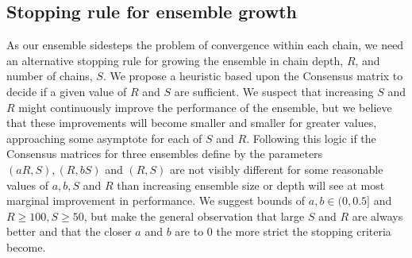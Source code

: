 \documentclass[]{article}
\begin{document}

\subsection{Stopping rule for ensemble growth} \label{sec:stopping}
As our ensemble sidesteps the problem of convergence within each chain, we need an alternative stopping rule for growing the ensemble in chain depth, $R$, and number of chains, $S$. We propose a heuristic based upon the Consensus matrix to decide if a given value of $R$ and $S$ are sufficient. We suspect that increasing $S$ and $R$ might continuously improve the performance of the ensemble, but we believe that these improvements will become smaller and smaller for greater values, approaching some asymptote for each of $S$ and $R$. Following this logic if the Consensus matrices for three ensembles define by the parameters $(aR, S), (R, bS)$ and $(R, S)$ are not visibly different for some reasonable values of $a, b, S$ and $R$ than increasing ensemble size or depth will see at most marginal improvement in performance. We suggest bounds of $a, b \in (0, 0.5]$ and $R \geq 100, S \geq 50$, but make the general observation that large $S$ and $R$ are always better and that the closer $a$ and $b$ are to 0 the more strict the stopping criteria become.

\end{document}
